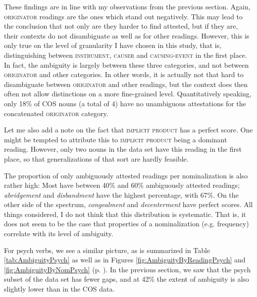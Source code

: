These findings are in line with my observations from the previous section. Again, \textsc{originator} readings are the ones which stand out negatively. This may lead to the conclusion that not only are they harder to find attested, but if they are, their contexts do not disambiguate as well as for other readings. However, this is only true on the level of granularity I have chosen in this study, that is, distinguishing between \textsc{instrument, causer} and \textsc{causing-event} in the first place. In fact, the ambiguity is largely between these three categories, and not between \textsc{originator} and other categories. In other words, it is actually not that hard to disambiguate between \textsc{originator} and other readings, but the context does then often not allow distinctions on a more fine-grained level. Quantitatively speaking, only 18\% of COS nouns (a total of 4) have no unambiguous attestations for the concatenated \textsc{originator} category. 

Let me also add a note on the fact that \textsc{implicit product} has a perfect score. One might be tempted to attribute this to \textsc{implicit product} being a dominant reading. However, only two nouns in the data set have this reading in the first place, so that generalizations of that sort are hardly feasible.

The proportion of only ambiguously attested readings per nominalization is also rather high: Most have between 40\% and 60\% ambiguously attested readings; \textit{abridgement} and \textit{disbandment} have the highest percentage, with 67\%. On the other side of the spectrum, \textit{congealment} and \textit{decenterment} have perfect scores. All things considered, I do not think that this distribution is systematic. That is, it does not seem to be the case that properties of a nominalization (e.g. frequency) correlate with its level of ambiguity. 

For psych verbs, we see a similar picture, as is summarized in Table \ref{tab:AmbiguityPsych} as well as in Figures \ref{fig:AmbiguityByReadingPsych} and \ref{fig:AmbiguityByNomPsych} (p. \pageref{fig:AmbiguityByReadingPsych}). In the previous section, we saw that the psych subset of the data set has fewer gaps, and at 42\% the extent of ambiguity is also slightly lower than in the COS data.

